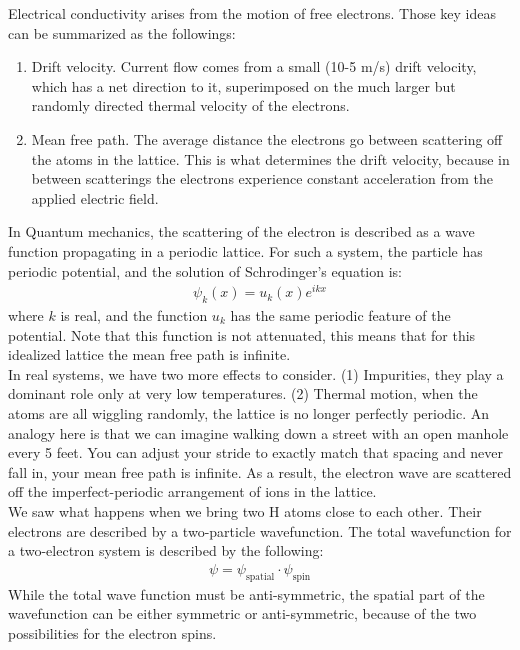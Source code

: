 \documentclass[11pt]{article}
\theoremstyle{break}
\theoremstyle{break}
\begin{document}
Electrical conductivity arises from the motion of free electrons. Those key ideas can be summarized as the followings:
\begin{enumerate}
\item Drift velocity. Current flow comes from a small (10-5 m/s) drift velocity, which has a net direction to it, superimposed on the much larger but randomly directed thermal velocity of the electrons.
\item Mean free path. The average distance the electrons go between scattering off the atoms in the lattice. This is what determines the drift velocity, because in between scatterings the electrons experience constant acceleration from the applied electric field.
\end{enumerate}

In Quantum mechanics, the scattering of the electron is described as a wave function propagating in a periodic lattice. For such a system, the particle has periodic potential, and the solution of Schrodinger's equation is:
\begin{align*}
\psi_k(x) = u_k(x) e^{ikx}
\end{align*}
where $k$ is real, and the function $u_k$ has the same periodic feature of the potential. Note that this function is not attenuated, this means that for this idealized lattice the mean free path is infinite.\\

In real systems, we have two more effects to consider. (1) Impurities, they play a dominant role only at very low temperatures. (2) Thermal motion, when the atoms are all wiggling randomly, the lattice is no longer perfectly periodic. An analogy here is that we can imagine walking down a street with an open manhole every 5 feet. You can adjust your stride to exactly match that spacing and never fall in, your mean free path is infinite. As a result, the electron wave are scattered off the imperfect-periodic arrangement of ions in the lattice.\\



We saw what happens when we bring two H atoms close to each other. Their electrons are described by a two-particle wavefunction. The total wavefunction for a two-electron system is described by the following:
\begin{align*}
\psi = \psi_{\text{spatial}} \cdot \psi_{\text{spin}}
\end{align*}
While the total wave function must be anti-symmetric, the spatial part of the wavefunction can be either symmetric or anti-symmetric, because of the two possibilities for the electron spins.\\
\end{document}
